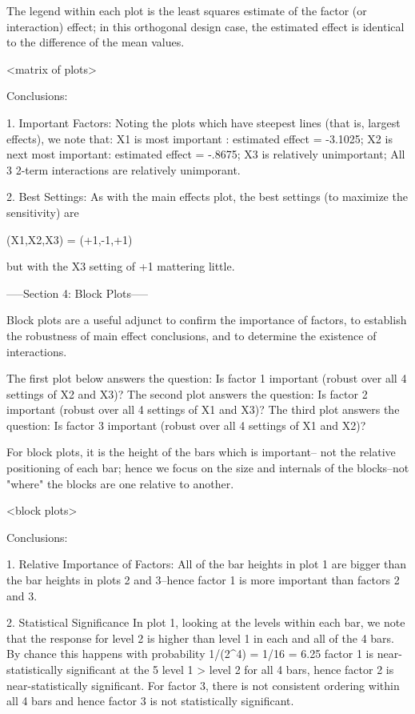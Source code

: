The legend within each plot is the least squares
estimate of the factor (or interaction) effect; in
this orthogonal design case, the estimated effect
is identical to the difference of the mean values.

<matrix of plots>

Conclusions:

1. Important Factors:
   Noting the plots which have steepest lines (that is,
   largest effects), we note that:
      X1 is most important     : estimated effect = -3.1025;
      X2 is next most important: estimated effect = -.8675;
      X3 is relatively unimportant;
      All 3 2-term interactions are relatively unimporant.

2. Best Settings:
   As with the main effects plot, the best settings
   (to maximize the sensitivity) are

      (X1,X2,X3) = (+1,-1,+1)

    but with the X3 setting of +1 mattering little.

-----Section 4: Block Plots-----

Block plots are a useful adjunct to confirm the importance of
factors, to establish the robustness of main effect conclusions,
and to determine the existence of interactions.

The first plot below answers the question: Is factor 1 important
(robust over all 4 settings of X2 and X3)?
The second plot answers the question: Is factor 2 important
(robust over all 4 settings of X1 and X3)?
The third plot answers the question: Is factor 3 important
(robust over all 4 settings of X1 and X2)?

For block plots, it is the height of the bars which is important--
not the relative positioning of each bar; hence we focus on the
size and internals of the blocks--not "where" the blocks are one
relative to another.

<block plots>

Conclusions:

1. Relative Importance of Factors:
   All of the bar heights in plot 1 are bigger
   than the bar heights in plots 2 and 3--hence
   factor 1 is more important than factors 2
   and 3.

2. Statistical Significance
   In plot 1, looking at the levels within each
   bar, we note that the response for level 2
   is higher than level 1 in each and all of
   the 4 bars.  By chance this happens with
   probability 1/(2^4) = 1/16 = 6.25%
   factor 1 is near-statistically significant
   at the 5%
   level 1 > level 2 for all 4 bars, hence
   factor 2 is near-statistically significant.
   For factor 3, there is not consistent
   ordering within all 4 bars and hence factor
   3 is not statistically significant.

